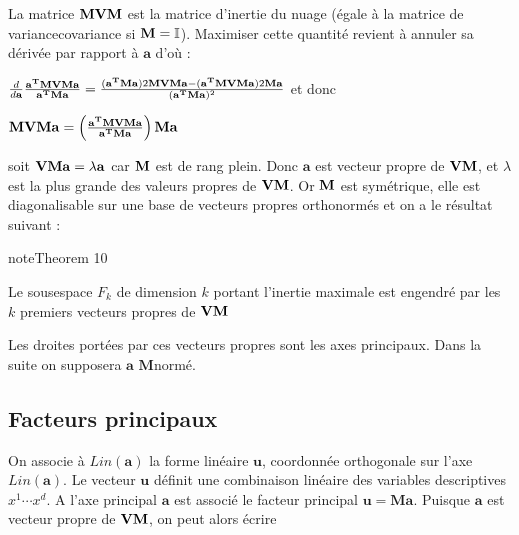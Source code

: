 \documentclass[letterpaper,10pt,french]{sphinxmanual}
\begin{document}
\sphinxAtStartPar
La matrice \({\bf MVM}\) est la matrice d’inertie du nuage (égale à la matrice de variance\sphinxhyphen{}covariance si \({\bf M}=\mathbb I\)).  Maximiser cette quantité revient à annuler sa dérivée par rapport à \(\mathbf{a}\) d’où :

\sphinxAtStartPar
\(
\frac{d}{d\mathbf{a}}\frac{\mathbf{a^T}{\bf MVM}\mathbf{a}}{\mathbf{a^T}{\bf M}\mathbf{a}}=\frac{(\mathbf{a^T}{\bf M}\mathbf{a})2{\bf MVM}\mathbf{a}-(\mathbf{a^T}{\bf MVM}\mathbf{a})2{\bf M}\mathbf{a}}{(\mathbf{a^T}{\bf M}\mathbf{a})^2}
\)
et donc

\sphinxAtStartPar
\({\bf MVM}\mathbf{a}=\left (\frac{\mathbf{a^T}{\bf MVM}\mathbf{a}}{\mathbf{a^T}{\bf M}\mathbf{a}} \right ){\bf M}\mathbf{a}\)

\sphinxAtStartPar
soit \({\bf VM}\mathbf{a}=\lambda \mathbf{a}\) car \({\bf M}\) est de rang plein. Donc \(\mathbf{a}\) est vecteur propre de \({\bf VM}\), et \(\lambda\) est la plus grande des valeurs propres de \({\bf VM}\). Or \({\bf M}\) est symétrique, elle est diagonalisable sur une base de vecteurs propres orthonormés et on a le résultat suivant :
\label{acp:theorem-1}
\begin{sphinxadmonition}{note}{Theorem 10}



\sphinxAtStartPar
Le sous\sphinxhyphen{}espace \(F_k\) de dimension \(k\) portant l’inertie maximale est engendré par les \(k\) premiers vecteurs propres de \({\bf VM}\)
\end{sphinxadmonition}

\sphinxAtStartPar
Les droites portées par ces vecteurs propres sont les axes principaux. Dans la suite on supposera \(\mathbf{a}\) \(\mathbf M\)\sphinxhyphen{}normé.


\subsection{Facteurs principaux}
\label{\detokenize{acp:facteurs-principaux}}
\ignorespaces 
{}\ignorespaces 
\sphinxAtStartPar
On associe à  \(Lin(\mathbf{a})\) la forme linéaire \(\mathbf{u}\), coordonnée orthogonale sur l’axe \(Lin(\mathbf{a})\). Le vecteur \(\mathbf{u}\) définit une combinaison linéaire des variables descriptives \(x^1\cdots x^d\). A l’axe principal \(\mathbf{a}\) est associé le facteur principal \(\mathbf{u}=\mathbf{Ma}\). Puisque \(\mathbf{a}\) est vecteur propre de \({\bf VM}\), on peut alors écrire
\end{document}
